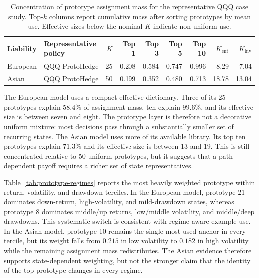 \documentclass[sigconf]{acmart}
\begin{document}
\begin{table}[t]
\centering
\small
\begin{tabular}{llrrrrrrr}
\toprule
Liability & Representative policy & $K$ & Top 1 & Top 3 & Top 5 & Top 10 &
$K_{\mathrm{ent}}$ & $K_{\mathrm{inv}}$ \\
\midrule
European & QQQ ProtoHedge & 25 & 0.208 & 0.584 & 0.747 & 0.996 & 8.29 & 7.04 \\
Asian & QQQ ProtoHedge & 50 & 0.199 & 0.352 & 0.480 & 0.713 & 18.78 & 13.04 \\
\bottomrule
\end{tabular}
\caption{Concentration of prototype assignment mass for the representative QQQ
case study. Top-$k$ columns report cumulative mass after sorting prototypes by
mean use. Effective sizes below the nominal $K$ indicate non-uniform use.}
\label{tab:prototype-concentration}
\end{table}

The European model uses a compact effective dictionary. Three of its 25
prototypes explain $58.4\%$ of assignment mass, ten explain $99.6\%$, and its
effective size is between seven and eight. The prototype layer is therefore
not a decorative uniform mixture: most decisions pass through a substantially
smaller set of recurring states. The Asian model uses more of its available
library. Its top ten prototypes explain $71.3\%$ and its effective size is
between 13 and 19. This is still concentrated relative to 50 uniform
prototypes, but it suggests that a path-dependent payoff requires a richer set
of state representatives.

Table~\ref{tab:prototype-regimes} reports the most heavily weighted prototype
within return, volatility, and drawdown terciles. In the European model,
prototype 21 dominates down-return, high-volatility, and mild-drawdown states,
whereas prototype 8 dominates middle/up returns, low/middle volatility, and
middle/deep drawdowns. This systematic switch is consistent with regime-aware
example use. In the Asian model, prototype 10 remains the single most-used
anchor in every tercile, but its weight falls from $0.215$ in low volatility to
$0.182$ in high volatility while the remaining assignment mass redistributes.
The Asian evidence therefore supports state-dependent weighting, but not the
stronger claim that the identity of the top prototype changes in every regime.
\end{document}
